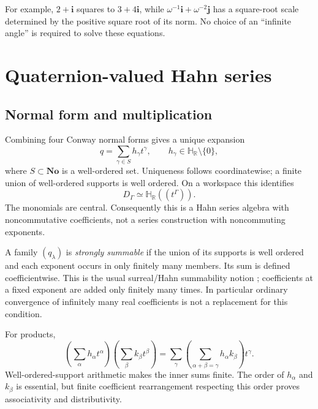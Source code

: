 \documentclass[11pt,letterpaper]{article}
\numberwithin{equation}{section}
\theoremstyle{definition}
\theoremstyle{remark}
\newcommand{\No}{\mathbf{No}}
\newcommand{\HR}{\mathbb H_{\mathbb R}}
\newcommand{\ii}{\mathbf i}
\newcommand{\jj}{\mathbf j}
\begin{document}
For example, $2+\ii$ squares to $3+4\ii$, while
$\omega^{-1}\ii+\omega^{-2}\jj$ has a square-root scale determined by the positive square
root of its norm. No choice of an ``infinite angle'' is required to solve these equations.

\section{Quaternion-valued Hahn series}\label{sec:hahn}

\subsection{Normal form and multiplication}
Combining four Conway normal forms gives a unique expansion
\begin{equation}\label{eq:qnormal}
 q=\sum_{\gamma\in S}h_\gamma t^\gamma,
 \qquad h_\gamma\in\HR\setminus\{0\},
\end{equation}
where $S\subset\No$ is a well-ordered set. Uniqueness follows coordinatewise; a finite union
of well-ordered supports is well ordered. On a workspace this identifies
\begin{equation}\label{eq:hahnbridge}
 D_\Gamma\simeq\HR((t^\Gamma)).
\end{equation}
The monomials are central. Consequently this is a Hahn series algebra with noncommutative
coefficients, not a series construction with noncommuting exponents.

A family $(q_\lambda)$ is \emph{strongly summable} if the union of its supports is well ordered
and each exponent occurs in only finitely many members. Its sum is defined coefficientwise.
This is the usual surreal/Hahn summability notion \cite{BM}; coefficients at a fixed exponent
are added only finitely many times. In particular ordinary convergence of infinitely many
real coefficients is not a replacement for this condition.

For products,
\[
 \left(\sum_\alpha h_\alpha t^\alpha\right)
 \left(\sum_\beta k_\beta t^\beta\right)
 =\sum_\gamma\left(\sum_{\alpha+\beta=\gamma}h_\alpha k_\beta\right)t^\gamma.
\]
Well-ordered-support arithmetic makes the inner sums finite. The order of $h_\alpha$ and
$k_\beta$ is essential, but finite coefficient rearrangement respecting this order proves
associativity and distributivity.
\end{document}
